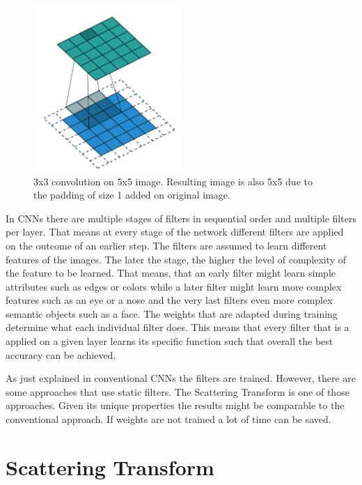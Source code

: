 \begin{figure}[!htb]
	\centering
	\includegraphics[width=0.5\textwidth]{images/convolution.png}
	\caption{3x3 convolution on 5x5 image. Resulting image is also 5x5 due to the padding of size 1 added on original image. \protect\footnotemark}
	\label{fig:convolution}
\end{figure}


In CNNs there are multiple stages of filters in sequential order and multiple filters per layer. That means at every stage of the network different filters are applied on the outcome of an earlier step. The filters are assumed to learn different features of the images. The later the stage, the higher the level of complexity of the feature to be learned. That means, that an early filter might learn simple attributes such as edges or colors while a later filter might learn more complex features such as an eye or a nose and the very last filters even more complex semantic objects such as a face. The weights that are adapted during training determine what each individual filter does. This means that every filter that is a applied on a given layer learns its specific function such that overall the best accuracy can be achieved. 

As just explained in conventional CNNs the filters are trained. However, there are some approaches that use static filters. The Scattering Transform is one of those approaches. Given its unique properties the results might be comparable to the conventional approach. If weights are not trained a lot of time can be saved. 

\section{Scattering Transform}

